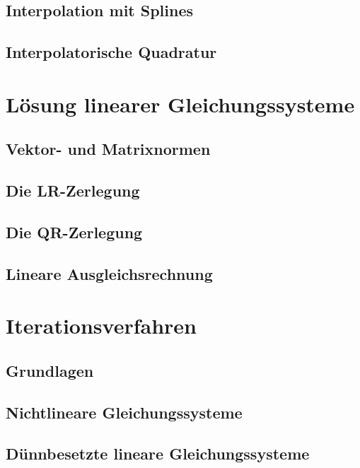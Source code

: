 \section{Interpolation mit Splines}


%

\section{Interpolatorische Quadratur}


\chapter{Lösung linearer Gleichungssysteme}

\section{Vektor- und Matrixnormen}


\section{Die LR-Zerlegung}


\section{Die QR-Zerlegung}


\section{Lineare Ausgleichsrechnung}


\chapter{Iterationsverfahren}

\section{Grundlagen}


\section{Nichtlineare Gleichungssysteme}


\section{Dünnbesetzte lineare Gleichungssysteme}




\printindex

